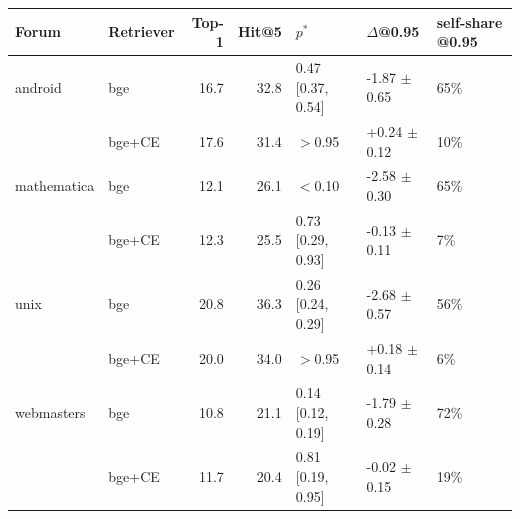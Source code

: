 \begin{tabular}{llrrlll}\toprule Forum & Retriever & Top-1 & Hit@5 & $p^*$ & $\Delta$@0.95 & self-share @0.95\\\midrule
android & bge & 16.7 & 32.8 & 0.47 [0.37, 0.54] & -1.87 $\pm$ 0.65 & 65\%\\
 & bge+CE & 17.6 & 31.4 & $>$0.95 & +0.24 $\pm$ 0.12 & 10\%\\
mathematica & bge & 12.1 & 26.1 & $<$0.10 & -2.58 $\pm$ 0.30 & 65\%\\
 & bge+CE & 12.3 & 25.5 & 0.73 [0.29, 0.93] & -0.13 $\pm$ 0.11 & 7\%\\
unix & bge & 20.8 & 36.3 & 0.26 [0.24, 0.29] & -2.68 $\pm$ 0.57 & 56\%\\
 & bge+CE & 20.0 & 34.0 & $>$0.95 & +0.18 $\pm$ 0.14 & 6\%\\
webmasters & bge & 10.8 & 21.1 & 0.14 [0.12, 0.19] & -1.79 $\pm$ 0.28 & 72\%\\
 & bge+CE & 11.7 & 20.4 & 0.81 [0.19, 0.95] & -0.02 $\pm$ 0.15 & 19\%\\
\bottomrule\end{tabular}